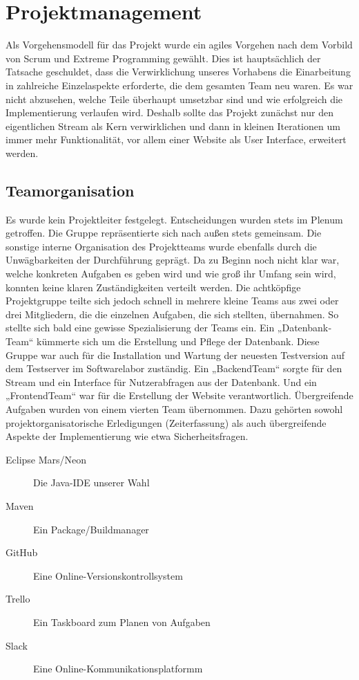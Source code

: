 \chapter{Projektmanagement}

Als Vorgehensmodell für das Projekt wurde ein agiles Vorgehen nach dem Vorbild von Scrum und
Extreme Programming gewählt. Dies ist hauptsächlich der Tatsache geschuldet, dass die
Verwirklichung unseres Vorhabens die Einarbeitung in zahlreiche Einzelaspekte erforderte, die
dem gesamten Team neu waren. Es war nicht abzusehen, welche Teile überhaupt umsetzbar sind
und wie erfolgreich die Implementierung verlaufen wird. Deshalb sollte das Projekt zunächst nur
den eigentlichen Stream als Kern verwirklichen und dann in kleinen Iterationen um immer mehr
Funktionalität, vor allem einer Website als User Interface, erweitert werden.

\section{Teamorganisation}
Es wurde kein Projektleiter festgelegt. Entscheidungen wurden stets im Plenum getroffen. Die
Gruppe repräsentierte sich nach außen stets gemeinsam.
Die sonstige interne Organisation des Projektteams wurde ebenfalls durch die Unwägbarkeiten der
Durchführung geprägt. Da zu Beginn noch nicht klar war, welche konkreten Aufgaben es geben
wird und wie groß ihr Umfang sein wird, konnten keine klaren Zuständigkeiten verteilt werden.
Die achtköpfige Projektgruppe teilte sich jedoch schnell in mehrere kleine Teams aus zwei oder
drei Mitgliedern, die die einzelnen Aufgaben, die sich stellten, übernahmen. So stellte sich bald
eine gewisse Spezialisierung der Teams ein. Ein „Datenbank­Team“ kümmerte sich um die
Erstellung und Pflege der Datenbank. Diese Gruppe war auch für die Installation und Wartung der
neuesten Testversion auf dem Testserver im Softwarelabor zuständig. Ein „Backend­Team“ sorgte
für den Stream und ein Interface für Nutzerabfragen aus der Datenbank. Und ein „Frontend­Team“
war für die Erstellung der Website verantwortlich. Übergreifende Aufgaben wurden von einem
vierten Team übernommen. Dazu gehörten sowohl projektorganisatorische Erledigungen
(Zeiterfassung) als auch übergreifende Aspekte der Implementierung wie etwa Sicherheitsfragen.

\begin{description}
 \item [Eclipse Mars/Neon] Die Java-IDE unserer Wahl 
 \item [Maven] Ein Package/Buildmanager  
 \item [GitHub] Eine Online-Versionskontrollsystem
 \item [Trello] Ein Taskboard zum Planen von Aufgaben
 \item [Slack] Eine Online-Kommunikationsplatformm
\end{description}

